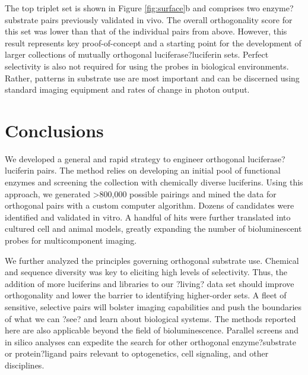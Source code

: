 The top triplet set is shown in Figure \ref{fig:surface}b and comprises two enzyme?substrate pairs previously validated in vivo. The overall orthogonality score for this set was lower than that of the individual pairs from above. However, this result represents key proof-of-concept and a starting point for the development of larger collections of mutually orthogonal luciferase?luciferin sets. Perfect selectivity is also not required for using the probes in biological environments. Rather, patterns in substrate use are most important and can be discerned using standard imaging equipment and rates of change in photon output.

\section{Conclusions}
We developed a general and rapid strategy to engineer orthogonal luciferase?luciferin pairs. The method relies on developing an initial pool of functional enzymes and screening the collection with chemically diverse luciferins. Using this approach, we generated >800,000 possible pairings and mined the data for orthogonal pairs with a custom computer algorithm. Dozens of candidates were identified and validated in vitro. A handful of hits were further translated into cultured cell and animal models, greatly expanding the number of bioluminescent probes for multicomponent imaging.
\par
We further analyzed the principles governing orthogonal substrate use. Chemical and sequence diversity was key to eliciting high levels of selectivity. Thus, the addition of more luciferins and libraries to our ?living? data set should improve orthogonality and lower the barrier to identifying higher-order sets. A fleet of sensitive, selective pairs will bolster imaging capabilities and push the boundaries of what we can ?see? and learn about biological systems. The methods reported here are also applicable beyond the field of bioluminescence. Parallel screens and in silico analyses can expedite the search for other orthogonal enzyme?substrate or protein?ligand pairs relevant to optogenetics, cell signaling, and other disciplines.




